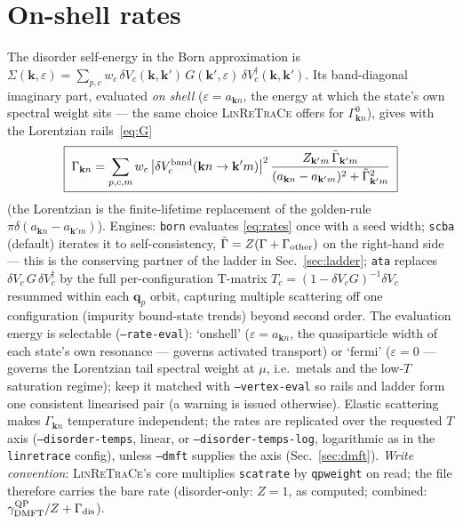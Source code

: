 \documentclass[11pt]{article}
\newcommand{\vk}{\mathbf{k}}
\newcommand{\vq}{\mathbf{q}}
\newcommand{\eps}{\varepsilon}
\newcommand{\Gam}{\Gamma}
\begin{document}
\section{On-shell rates}
\label{sec:rates}
The disorder self-energy in the Born approximation is
$\Sigma(\vk,\eps)=\sum_{p,c}w_c\,\delta V_c(\vk,\vk')\,G(\vk',\eps)\,
\delta V_c^\dagger(\vk,\vk')$.  Its band-diagonal imaginary part,
evaluated \emph{on shell} ($\eps=a_{\vk n}$, the energy at which the
state's own spectral weight sits --- the same choice
\textsc{LinReTraCe} offers for $\Gam^0_{\vk n}$), gives with the
Lorentzian rails~\eqref{eq:G}
\begin{equation}
\boxed{\;
\Gam_{\vk n}=\sum_{p,c,m} w_c\,
\big|\delta V^{\rm band}_{c}(\vk n\to\vk'm)\big|^{2}\,
\frac{Z_{\vk'm}\,\tilde\Gam_{\vk'm}}
{(a_{\vk n}-a_{\vk'm})^{2}+\tilde\Gam_{\vk'm}^{2}}\;}
\label{eq:rates}
\end{equation}
(the Lorentzian is the finite-lifetime replacement of the golden-rule
$\pi\delta(a_{\vk n}-a_{\vk'm})$).  Engines:
\texttt{born} evaluates \eqref{eq:rates} once with a seed width;
\texttt{scba} (default) iterates it to self-consistency,
$\tilde\Gam=Z(\Gam+\Gam_{\rm other})$ on the right-hand side --- this is
the conserving partner of the ladder in Sec.~\ref{sec:ladder};
\texttt{ata} replaces $\delta V_c\,G\,\delta V_c^\dagger$ by the full
per-configuration T-matrix $T_c=(1-\delta V_cG)^{-1}\delta V_c$ resummed
within each $\vq_p$ orbit, capturing multiple scattering off one
configuration (impurity bound-state trends) beyond second order.
The evaluation energy is selectable (\texttt{--rate-eval}): `onshell'
($\eps=a_{\vk n}$, the quasiparticle width of each state's own
resonance --- governs activated transport) or `fermi' ($\eps=0$ ---
governs the Lorentzian tail spectral weight at $\mu$, i.e.\ metals and
the low-$T$ saturation regime); keep it matched with
\texttt{--vertex-eval} so rails and ladder form one consistent
linearised pair (a warning is issued otherwise).
Elastic scattering makes $\Gam_{\vk n}$ temperature independent; the
rates are replicated over the requested $T$ axis
(\texttt{--disorder-temps}, linear, or \texttt{--disorder-temps-log},
logarithmic as in the \texttt{linretrace} config), unless
\texttt{--dmft} supplies the axis (Sec.~\ref{sec:dmft}).
\emph{Write convention}: \textsc{LinReTraCe}'s core multiplies
\texttt{scatrate} by \texttt{qpweight} on read; the file therefore
carries the bare rate (disorder-only: $Z=1$, as computed; combined:
$\gamma^{\rm QP}_{\rm DMFT}/Z+\Gam_{\rm dis}$).
\end{document}
